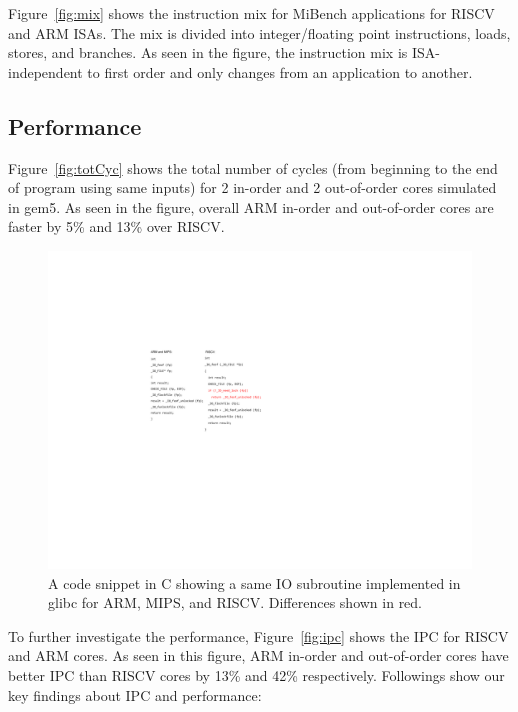 Figure~\ref{fig:mix} shows the instruction mix for MiBench applications for RISCV and ARM ISAs. The mix is divided into integer/floating point instructions, loads, stores, and branches. As seen in the figure, the instruction mix is ISA-independent to first order and only changes from an application to another. 





\subsection{Performance}
Figure~\ref{fig:totCyc} shows the total number of cycles (from beginning to the end of program using same inputs) for 2 in-order and 2 out-of-order cores simulated in gem5. As seen in the figure, overall ARM in-order and out-of-order cores are faster by 5\% and 13\% over RISCV. 

\begin{figure}[H]
	\centering
	\includegraphics[width=1\columnwidth]{figures/libc.pdf}
	\caption{A code snippet in C showing a same IO subroutine implemented in glibc for ARM, MIPS, and RISCV. Differences shown in red.}
	\label{fig:libc}
\end{figure} 


To further investigate the performance, Figure~\ref{fig:ipc} shows the IPC for RISCV and ARM cores. As seen in this figure, ARM in-order and out-of-order cores have better IPC than RISCV cores by 13\% and 42\% respectively. Followings show our key findings about IPC and performance:


